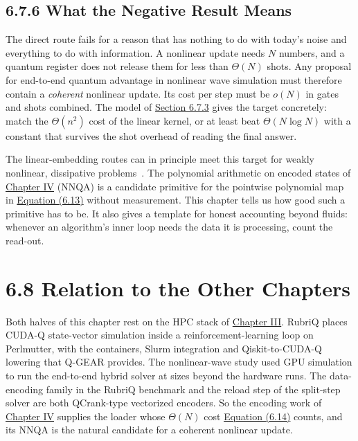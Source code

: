 \documentclass{report}
\theoremstyle{plain}
\theoremstyle{definition}
\theoremstyle{remark}
\begin{document}
\subsection{6.7.6 What the Negative Result Means}\label{sec:syn:waves-meaning}

The direct route fails for a reason that has nothing to do with today's noise and everything to do with information. A nonlinear update needs $N$ numbers, and a quantum register does not release them for less than $\Theta(N)$ shots. Any proposal for end-to-end quantum advantage in nonlinear wave simulation must therefore contain a \emph{coherent} nonlinear update. Its cost per step must be $o(N)$ in gates and shots combined. The model of \hyperref[sec:syn:costmodel]{Section 6.7.3} gives the target concretely: match the $\Theta(n^{2})$ cost of the linear kernel, or at least beat $\Theta(N\log N)$ with a constant that survives the shot overhead of reading the final answer.

The linear-embedding routes can in principle meet this target for weakly nonlinear, dissipative problems~\cite{liu2021carleman}. The polynomial arithmetic on encoded states of \hyperref[ch:qml]{Chapter IV} (NNQA) is a candidate primitive for the pointwise polynomial map in \hyperref[eq:syn:poly]{Equation (6.13)} without measurement. This chapter tells us how good such a primitive has to be. It also gives a template for honest accounting beyond fluids: whenever an algorithm's inner loop needs the data it is processing, count the read-out.

\section{6.8 Relation to the Other Chapters}\label{sec:syn:relation}

Both halves of this chapter rest on the HPC stack of \hyperref[ch:qgear]{Chapter III}. RubriQ places CUDA-Q state-vector simulation inside a reinforcement-learning loop on Perlmutter, with the containers, Slurm integration and Qiskit-to-CUDA-Q lowering that Q-GEAR provides. The nonlinear-wave study used GPU simulation to run the end-to-end hybrid solver at sizes beyond the hardware runs. The data-encoding family in the RubriQ benchmark and the reload step of the split-step solver are both QCrank-type vectorized encoders. So the encoding work of \hyperref[ch:qml]{Chapter IV} supplies the loader whose $\Theta(N)$ cost \hyperref[eq:syn:costq]{Equation (6.14)} counts, and its NNQA is the natural candidate for a coherent nonlinear update.
\end{document}

